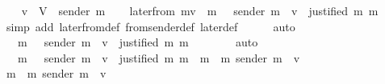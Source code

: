 \begin{isabellebody}
\ \ \isamarkupfalse%
\ {\isachardoublequoteopen}v\ {\isasymin}\ V\ {\isacharminus}\ {\isacharbraceleft}sender\ m{\isacharprime}{\isacharbraceright}{\isachardoublequoteclose}\isanewline
\isanewline
\ \ \isamarkupfalse%
\ {\isachardoublequoteopen}later{\isacharunderscore}from\ {\isacharparenleft}m{\isacharcomma}v{\isacharcomma}{\isasymsigma}{\isacharparenright}\ {\isacharequal}\ {\isacharbraceleft}m{\isacharprime}{\isacharprime}\ {\isasymin}\ {\isasymsigma}{\isachardot}\ sender\ m{\isacharprime}{\isacharprime}\ {\isacharequal}\ v\ {\isasymand}\ justified\ m\ m{\isacharprime}{\isacharprime}{\isacharbraceright}{\isachardoublequoteclose}\isanewline
\ \ \ \ \isamarkupfalse%
\ {\isacharparenleft}simp\ add{\isacharcolon}\ later{\isacharunderscore}from{\isacharunderscore}def\ from{\isacharunderscore}sender{\isacharunderscore}def\ later{\isacharunderscore}def{\isacharparenright}\isanewline
\ \ \ \ \isamarkupfalse%
\ auto\isanewline
\ \ \isamarkupfalse%
\ \isamarkupfalse%
\ {\isachardoublequoteopen}{\isasymdots}\ {\isacharequal}\ {\isacharbraceleft}m{\isacharprime}{\isacharprime}\ {\isasymin}\ {\isasymsigma}{\isachardot}\ sender\ m{\isacharprime}{\isacharprime}\ {\isacharequal}\ v\ {\isasymand}\ justified\ m\ m{\isacharprime}{\isacharprime}{\isacharbraceright}\ {\isasymunion}\ {\isasymemptyset}{\isachardoublequoteclose}\isanewline
\ \ \ \ \isamarkupfalse%
\ auto\ \ \ \ \isanewline
\ \ \isamarkupfalse%
\ \isamarkupfalse%
\ {\isachardoublequoteopen}{\isasymdots}\ {\isacharequal}\ {\isacharbraceleft}m{\isacharprime}{\isacharprime}\ {\isasymin}\ {\isasymsigma}{\isachardot}\ sender\ m{\isacharprime}{\isacharprime}\ {\isacharequal}\ v\ {\isasymand}\ justified\ m\ m{\isacharprime}{\isacharprime}{\isacharbraceright}\ {\isasymunion}\ {\isacharbraceleft}m{\isacharprime}{\isacharprime}\ {\isasymin}\ {\isacharbraceleft}m{\isacharprime}{\isacharbraceright}{\isachardot}\ sender\ m{\isacharprime}{\isacharprime}\ {\isacharequal}\ v{\isacharbraceright}{\isachardoublequoteclose}\isanewline
\ \ \isamarkupfalse%
{\isacharminus}\isanewline
\ \ \ \ \isamarkupfalse%
\ {\isachardoublequoteopen}{\isacharbraceleft}m{\isacharprime}{\isacharprime}\ {\isasymin}\ {\isacharbraceleft}m{\isacharprime}{\isacharbraceright}{\isachardot}\ sender\ m{\isacharprime}{\isacharprime}\ {\isacharequal}\ v{\isacharbraceright}\ {\isacharequal}\ {\isasymemptyset}{\isachardoublequoteclose}\isanewline
\ \ \ \ \ \ \isamarkupfalse%

\end{isabellebody}
